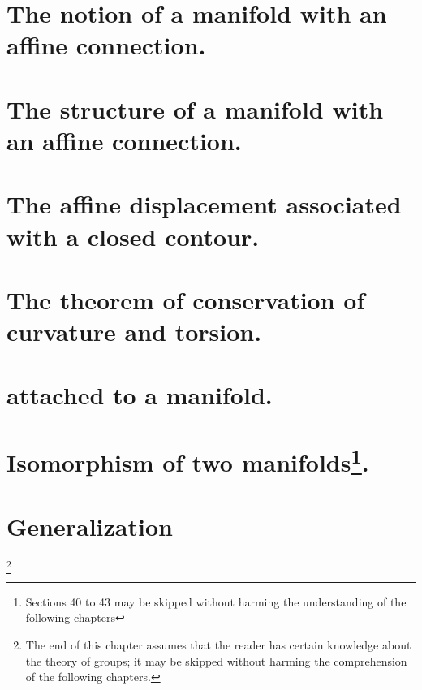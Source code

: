 \documentclass{report}
\begin{document}



\section*{The notion of a manifold with an affine connection.}





\section*{The structure of a manifold with an affine connection.}





\section*{The affine displacement associated with a closed contour.}





\section*{The theorem of conservation of curvature and torsion.}



\section*{ attached to a manifold.}




\section*{Isomorphism of two manifolds\footnote{Sections 40 to 43 may be skipped without harming the understanding of the following chapters}.}






\section*{Generalization}\footnote{The end of this chapter assumes that the reader has certain knowledge about the theory of groups; it may be skipped without harming the comprehension of the following chapters.}
\end{document}
